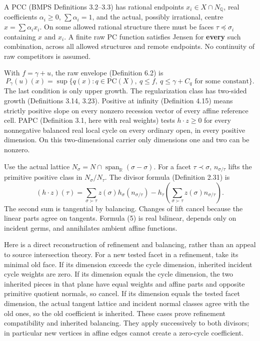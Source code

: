 \documentclass[
  11pt,
]{article}
\begin{document}
A PCC (BMPS Definitions 3.2--3.3) has rational endpoints
\(x_i\in X\cap N_{\mathbb{Q}}\), real coefficients \(\alpha_i\geq0\),
\(\sum\alpha_i=1\), and the actual, possibly irrational, centre
\(x=\sum\alpha_i x_i\). On some allowed rational structure there must be
faces \(\tau\preceq\sigma_i\) containing \(x\) and \(x_i\). A finite raw
PC function satisfies Jensen for \textbf{every} such combination, across
all allowed structures and remote endpoints. No continuity of raw
competitors is assumed.

With \(f=\gamma+u\), the raw envelope (Definition 6.2) is \[
 P_\gamma(u)(x)=\sup\{q(x):q\in\mathrm{PC}(X),\ q\leq f,
                          \ q\leq\gamma+C_q\text{ for some constant}\}.
                                                               \tag{4}
\] The last condition is only upper growth. The regularization class has
two-sided growth (Definitions 3.14, 3.23). Positive at infinity
(Definition 4.15) means strictly positive slope on every nonzero
recession vector of every affine reference cell. PAPC (Definition 3.1,
here with real weights) tests \(h\cdot z\geq0\) for every nonnegative
balanced real local cycle on every ordinary open, in every positive
dimension. On this two-dimensional carrier only dimensions one and two
can be nonzero.

Use the actual lattice
\(N_\sigma=N\cap\operatorname{span}_{\mathbb{R}}(\sigma-\sigma)\). For a
facet \(\tau\prec\sigma\), \(n_{\sigma/\tau}\) lifts the primitive
positive class in \(N_\sigma/N_\tau\). The divisor formula (Definition
2.31) is \[
 (h\cdot z)(\tau)=\sum_{\sigma\succ\tau}z(\sigma)h_\sigma(n_{\sigma/\tau})
       -h_\tau\left(\sum_{\sigma\succ\tau}z(\sigma)n_{\sigma/\tau}\right).
                                                               \tag{5}
\] The second sum is tangential by balancing. Changes of lift cancel
because the linear parts agree on tangents. Formula (5) is real
bilinear, depends only on incident germs, and annihilates ambient affine
functions.

Here is a direct reconstruction of refinement and balancing, rather than
an appeal to source intersection theory. For a new tested facet in a
refinement, take its minimal old face. If its dimension exceeds the
cycle dimension, inherited incident cycle weights are zero. If its
dimension equals the cycle dimension, the two inherited pieces in that
plane have equal weights and affine parts and opposite primitive
quotient normals, so cancel. If its dimension equals the tested facet
dimension, the actual tangent lattice and incident normal classes agree
with the old ones, so the old coefficient is inherited. These cases
prove refinement compatibility and inherited balancing. They apply
successively to both divisors; in particular new vertices in affine
edges cannot create a zero-cycle coefficient.
\end{document}
